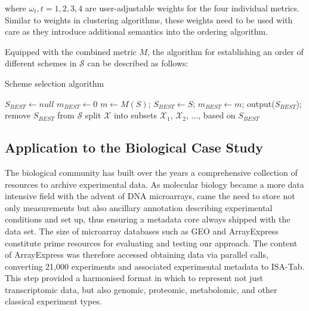 \noindent where $\omega_t, t=1,2,3,4$ are user-adjustable weights for the four individual metrics. Similar to weights in clustering algorithms, these weights need to be used with care as they introduce additional semantics into the ordering algorithm. 

Equipped with the combined metric $M$, the algorithm for establishing an order of different schemes in $\mathcal{S}$ can be described as follows:

\begin{algorithm}
\caption{Scheme selection algorithm}
 \begin{algorithmic}[1]
 		\State $S_{BEST} \gets null$  
		\State $m_{BEST} \gets 0$
       			\State $m \gets M(S)$;
           			\State $S_{BEST} \gets S$; 
					\State $m_{BEST} \gets m$;
            		\State output($S_{BEST}$);
           			\State remove $S_{BEST}$ from $\mathcal{S}$
            		\State split $\mathcal{X}$ into subsets $\mathcal{X}_{1}$, $\mathcal{X}_{2}$, $\ldots$, based on $S_{BEST}$

                 				\Return 
         				 \EndIf
         			 
              		\State {}
         		\EndFor
     			\EndIf
  		\EndFor 
	\EndFunction
\end{algorithmic}
\end{algorithm}


\subsection{Application to the Biological Case Study}
%
The biological community has built over the years a comprehensive collection of resources to archive experimental data. As molecular biology became a more data intensive field with the advent of DNA microarrays, came the need to store not only measurements but also ancillary annotation describing experimental conditions and set up, thus ensuring a metadata core always shipped with the data set. The size of microarray databases such as GEO \cite{barrett2011ncbi} and ArrayExpress \cite{ArrayExpress::2012} constitute prime resources for evaluating and testing our approach.
The content of ArrayExpress was therefore accessed obtaining data via parallel calls, converting 21,000 experiments and associated experimental metadata to ISA-Tab\cite{rocca-serra10,sansone12}.
This step provided a harmonised format in which to represent not just transcriptomic data, but also genomic, proteomic, metabolomic, and other classical experiment types.

